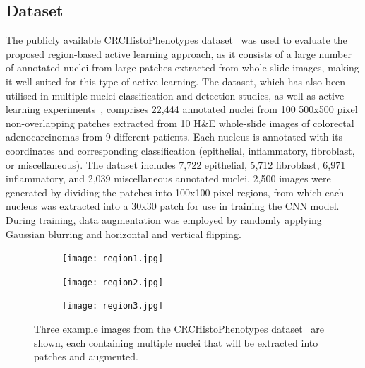 \subsection{Dataset}
\label{subsec:active_dataset}
The publicly available CRCHistoPhenotypes dataset~\citep{sirinukunwattana2016locality} was used to evaluate the proposed region-based active learning approach, as it consists of a large number of annotated nuclei from large patches extracted from whole slide images, making it well-suited for this type of active learning. The dataset, which has also been utilised in multiple nuclei classification and detection studies, as well as active learning experiments~\citep{shao2018deep}, comprises 22,444 annotated nuclei from 100 500x500 pixel non-overlapping patches extracted from 10 H\&E whole-slide images of colorectal adenocarcinomas from 9 different patients. Each nucleus is annotated with its coordinates and corresponding classification (epithelial, inflammatory, fibroblast, or miscellaneous). The dataset includes 7,722 epithelial, 5,712 fibroblast, 6,971 inflammatory, and 2,039 miscellaneous annotated nuclei. 2,500 images were generated by dividing the patches into 100x100 pixel regions, from which each nucleus was extracted into a 30x30 patch for use in training the CNN model. During training, data augmentation was employed by randomly applying Gaussian blurring and horizontal and vertical flipping.

\begin{figure}[t!]
	\centering
	\begin{subfigure}{0.3\textwidth}
		\texttt{[image: region1.jpg]}
	\end{subfigure}
	\begin{subfigure}{0.3\textwidth}
		\texttt{[image: region2.jpg]}
	\end{subfigure}
	\begin{subfigure}{0.3\textwidth}
		\texttt{[image: region3.jpg]}
	\end{subfigure}
	\caption{Three example images from the CRCHistoPhenotypes dataset~\cite{sirinukunwattana2016locality} are shown, each containing multiple nuclei that will be extracted into patches and augmented.}
	\label{fig:region_example}
\end{figure}

